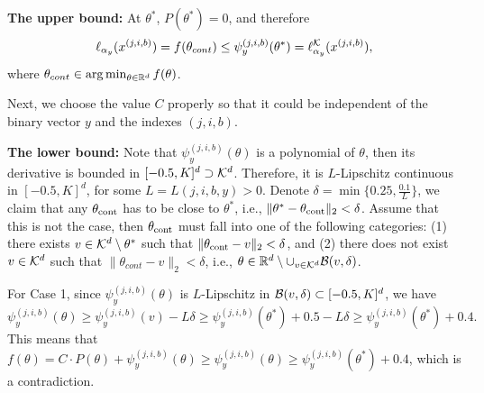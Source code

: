     \textbf{The upper bound:} At $\theta^*$, $P(\theta^*) = 0$, and therefore
    \[
        \ell_{\alpha_y}(x^{(j, i, b)}) = f(\theta_{cont}) \leq \psi^{(j, i, b)}_{y}(\theta^*) = \ell^{\mathcal{K}}_{\alpha_y}(x^{(j, i, b)}), 
    \]
    where $\theta_{cont} \in \arg \min_{\theta \in \mathbb{R}^d}f(\theta)$.

 
        Next, we choose the value $C$ properly so that it could be independent of the binary vector $y$ and the indexes $(j, i, b)$.
    
        \textbf{The lower bound:} Note that $\psi^{(j, i, b)}_{y}(\theta)$ is a polynomial of $\theta$, then its derivative is bounded in $[-0.5, K]^d \supset \mathcal{K}^d$. Therefore, it is $L$-Lipschitz continuous in $[-0.5, K]^d$, for some $L = L(j, i, b, y) > 0$. Denote $\delta = \min\{0.25, \frac{0.1}{L}\}$, we claim that any $\theta_{\textup{cont}}$ has to be close to $\theta^*$, i.e., $\|\theta^* - \theta_{\textup{cont}}\|_2 <\delta$. Assume that this is not the case, then $\theta_{\textup{cont}}$ must fall into one of the following categories: (1) there exists $v \in \mathcal{K}^d \setminus \theta^*$ such that $\|\theta_{\textup{cont}} - v\|_2 < \delta$, and (2) there does not exist $v \in \mathcal{K}^d$ such that $\|\theta_{cont} - v\|_2 < \delta$, i.e., $\theta \in \mathbb{R}^d \setminus \cup_{v \in \mathcal{K}^d}\mathcal{B}(v, \delta)$.
    
        For Case 1, since $\psi^{(j, i, b)}_{y}(\theta)$ is $L$-Lipschitz in $\mathcal{B}(v, \delta) \subset [-0.5, K]^d$, we have 
        \[
            \psi^{(j, i, b)}_{y}(\theta) \geq \psi^{(j, i, b)}_{y}(v) - L\delta \geq \psi^{(j, i, b)}_{y}(\theta^*) + 0.5 - L\delta \geq \psi^{(j, i, b)}_{y}(\theta^*) + 0.4.
        \]
        This means that $f(\theta) = C\cdot P(\theta) + \psi^{(j, i, b)}_{y}(\theta) \geq \psi^{(j, i, b)}_{y}(\theta) \geq \psi^{(j, i, b)}_{y}(\theta^*) + 0.4$, which is a contradiction.
    
